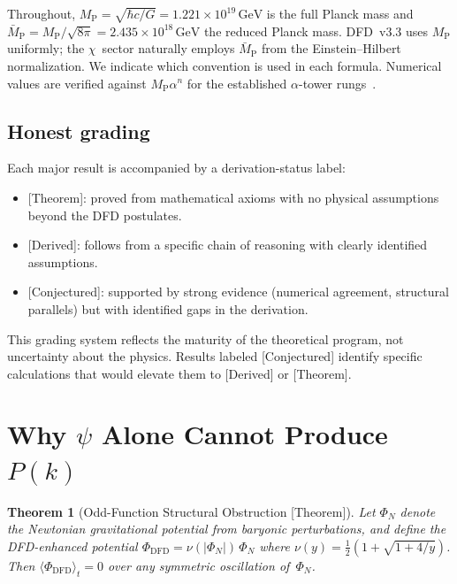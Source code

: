 \documentclass[aps,prd,twocolumn,superscriptaddress,showpacs,floatfix,nofootinbib]{revtex4-2}
\newtheorem{theorem}{Theorem}
\theoremstyle{definition}
\theoremstyle{remark}
\newcommand{\MP}{M_{\mathrm{P}}}
\newcommand{\MPbar}{\bar{M}_{\mathrm{P}}}
\newcommand{\GeV}{\,\mathrm{GeV}}
\newcommand{\grade}[1]{\textsf{\footnotesize [#1]}}
\begin{document}
Throughout, $\MP = \sqrt{\hbar c/G} = 1.221\times 10^{19}\GeV$
is the full Planck mass and
$\MPbar = \MP/\sqrt{8\pi} = 2.435\times 10^{18}\GeV$ the
reduced Planck mass. DFD~v3.3 uses $\MP$ uniformly; the
$\chi$~sector naturally employs $\MPbar$ from the
Einstein--Hilbert normalization. We indicate which convention
is used in each formula. Numerical values are verified
against $\MP\alpha^n$ for the established $\alpha$-tower
rungs~\cite{Alcock2025}.

\subsection{Honest grading}

Each major result is accompanied by a derivation-status
label:
\begin{itemize}
\item \grade{Theorem}: proved from mathematical axioms
  with no physical assumptions beyond the DFD postulates.
\item \grade{Derived}: follows from a specific chain of
  reasoning with clearly identified assumptions.
\item \grade{Conjectured}: supported by strong evidence
  (numerical agreement, structural parallels) but with
  identified gaps in the derivation.
\end{itemize}
This grading system reflects the maturity of the
theoretical program, not uncertainty about the physics.
Results labeled \grade{Conjectured} identify specific
calculations that would elevate them to \grade{Derived}
or \grade{Theorem}.

\section{Why $\psi$ Alone Cannot Produce $P(k)$}
\label{sec:impossibility}

\begin{theorem}[Odd-Function Structural Obstruction \grade{Theorem}]
\label{thm:odd}
Let $\Phi_N$ denote the Newtonian gravitational potential from
baryonic perturbations, and define the DFD-enhanced potential
$\Phi_{\mathrm{DFD}} = \nu(|\Phi_N|)\,\Phi_N$ where
$\nu(y)=\tfrac{1}{2}(1{+}\sqrt{1{+}4/y})$. Then
$\langle\Phi_{\mathrm{DFD}}\rangle_t = 0$ over any
symmetric oscillation of~$\Phi_N$.
\end{theorem}
\end{document}
